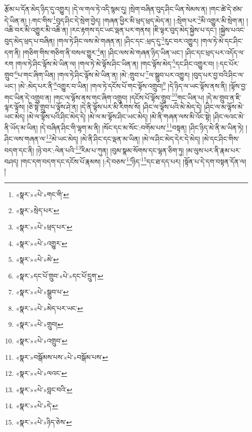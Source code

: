 རྩོམ་པ་དོན་མེད་ཉིད་དུ་འགྱུར། །དེ་ལ་གལ་ཏེ་འདི་སྙམ་དུ། །སྲེག་བཞིན་བུད་ཤིང་ཡིན་སེམས་ན། །གང་ཚེ་དེ་ཙམ་དེ་ཡིན་ན། །:གང་གིས་\footnote{«སྣར་»«པེ་»གང་གི་}བུད་ཤིང་དེ་སྲེག་བྱེད། །གཞན་ཕྱིར་མི་ཕྲད་ཕྲད་མེད་ན། །:སྲེག་པར་\footnote{«སྣར་»སྲེད་པར་}མི་འགྱུར་མི་སྲེག་ན། །འཆི་བར་མི་འགྱུར་མི་འཆི་ན། །རང་རྟགས་དང་ཡང་ལྡན་པར་གནས། །ཇི་ལྟར་བུད་མེད་སྐྱེས་པ་དང་། །སྐྱེས་པའང་བུད་མེད་ཕྲད་པ་བཞིན། །གལ་ཏེ་ཤིང་ལས་མེ་གཞན་ན། །ཤིང་དང་:ཕྲད་དུ་\footnote{«སྣར་»«པེ་»ཕྲད་པར་}རུང་བར་འགྱུར། །གལ་ཏེ་མེ་དང་ཤིང་དག་ནི། །གཅིག་གིས་གཅིག་ནི་བསལ་གྱུར་\footnote{«སྣར་»«པེ་»འགྱུར་}ན། །ཤིང་ལས་མེ་གཞན་ཉིད་ཡིན་ཡང་། །ཤིང་དང་ཕྲད་པར་འདོད་ལ་རག །གལ་ཏེ་ཤིང་ལྟོས་མེ་ཡིན་ལ། །གལ་ཏེ་མེ་ལྟོས་ཤིང་ཡིན་ན། །གང་ལྟོས་མེད་\footnote{«སྣར་»«པེ་»མེ་}དང་ཤིང་འགྱུར་བ། །:དང་པོར་གྲུབ་\footnote{«སྣར་»དང་པོ་གྲུབ་«པེ་»དང་པོ་དྲུག་}པ་གང་ཞིག་ཡིན། །གལ་ཏེ་ཤིང་ལྟོས་མེ་ཡིན་ན། །མེ་:གྲུབ་པ་\footnote{«སྣར་»«པེ་»སྒྲུབ་པ་}ལ་སྒྲུབ་པར་འགྱུར། །བུད་པར་བྱ་བའི་ཤིང་ལ་ཡང་། །མེ་:མེད་པར་ནི་\footnote{«སྣར་»«པེ་»མེད་པར་ཡང་}འགྱུར་བ་ཡིན། །གལ་ཏེ་དངོས་པོ་གང་ལྟོས་འགྲུབ།\footnote{«སྣར་»«པེ་»གྲུབ།} །དེ་ཉིད་ལ་ཡང་ལྟོས་ནས་ནི། །ལྟོས་བྱ་གང་ཡིན་དེ་འགྲུབ་ན། །གང་ལ་ལྟོས་ནས་གང་ཞིག་འགྲུབ། །དངོས་པོ་ལྟོས་གྲུབ་\footnote{«སྣར་»«པེ་»འགྲུབ་}གང་ཡིན་པ། །དེ་མ་གྲུབ་ན་ཇི་ལྟར་ལྟོས། །ཅི་སྟེ་གྲུབ་པ་ལྟོས་ཤེ་ན། །དེ་ནི་ལྟོས་པར་མི་རིགས་སོ། །ཤིང་ལ་ལྟོས་པའི་མེ་མེད་དེ། །ཤིང་ལ་མ་ལྟོས་མེ་ཡང་མེད། །མེ་ལ་ལྟོས་པའི་ཤིང་མེད་དེ། །མེ་ལ་མ་ལྟོས་ཤིང་ཡང་མེད། །མེ་ནི་གཞན་ལས་མི་འོང་སྟེ། །ཤིང་ལའང་མེ་ནི་ཡོད་མ་ཡིན། །དེ་བཞིན་ཤིང་གི་ལྷག་མ་ནི། །སོང་དང་མ་སོང་:བགོམ་པས་\footnote{«སྣར་»བསྒོམས་པས་«པེ་»བསྒོམ་པས་}བསྟན། །ཤིང་ཉིད་མེ་ནི་མ་ཡིན་ཏེ། །ཤིང་ལས་གཞན་ལ་\footnote{«སྣར་»«པེ་»ལའང་}མེ་ཡང་མེད། །མེ་ནི་ཤིང་དང་ལྡན་མ་ཡིན། །མེ་ལ་ཤིང་མེད་དེར་དེ་མེད། །མེ་དང་ཤིང་གིས་བདག་དང་ནི། །ཉེ་བར་:ལེན་པའི་\footnote{«སྣར་»«པེ་»བླང་བའི་}རིམ་པ་ཀུན། །བུམ་སྣམ་སོགས་དང་ལྷན་ཅིག་ཏུ། །མ་ལུས་པར་ནི་རྣམ་པར་བཤད། །གང་དག་བདག་དང་དངོས་པོ་རྣམས། །:དེ་བཅས་\footnote{«སྣར་»«པེ་»དེ་}ཉིད་\footnote{«སྣར་»«པེ་»ཉིད་ཅེས་}དང་ཐ་དད་པར། །སྟོན་པ་དེ་དག་བསྟན་དོན་ལ། །
